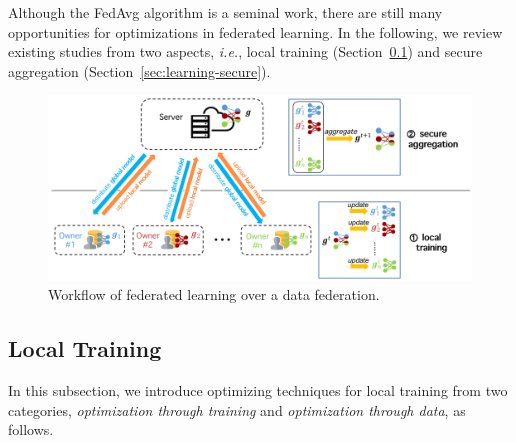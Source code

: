 \documentclass[11pt]{article}
\newcommand{\ie}{\textit{i.e.},\xspace}
\newcommand\secref[1]{Section~\ref{#1}}
\begin{document}
Although the \textsf{FedAvg} algorithm \cite{DBLP:conf/aistats/McMahanMRHA17} is a seminal work, there are still many opportunities for optimizations in federated learning. 
In the following, we review existing studies from two aspects,
\ie local training (\secref{sec:learning-local}) and secure aggregation (\secref{sec:learning-secure}).

\begin{figure}[t]
\centering
    \includegraphics[width=0.85\linewidth]{fig/fedavg.png}
	\caption{Workflow of federated learning over a data federation.}\label{fig:fedavg}
\end{figure}

\subsection{Local Training}\label{sec:learning-local}

In this subsection, we introduce optimizing techniques for local training from two categories, \textit{optimization through training} and \textit{optimization through data}, as follows.
\end{document}
